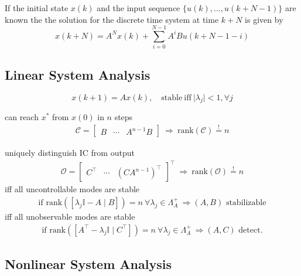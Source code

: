 If the initial state $x(k)$ and the input sequence $\{u(k), \ldots, u(k+N-1)\}$ are known the the solution for the discrete time system at time $k+N$ is given by
\begin{equation*}
    x(k+N) = A^N x(k) + \sum_{i=0}^{N-1} A^i B u(k+N-1-i)
\end{equation*}


\subsection{Linear System Analysis}


\noindent\begin{equation*}
    x(k+1) = Ax(k),\quad \mathrm{stable\ iff\ } \lvert \lambda_j \rvert < 1, \forall j
\end{equation*}


can reach $x^*$ from $x(0)$ in $n$ steps
\begin{align*}
    \mathcal{C} =
    \begin{bmatrix}
        B & \cdots & A^{n-1} B
    \end{bmatrix}
    \ \Rightarrow \ \mathrm{rank}(\mathcal{C}) \overset{!}{=} n
\end{align*}

 uniquely distinguish IC from output
\begin{align*}
    \mathcal{O} =
    \begin{bmatrix}
        C^\top & \cdots & {(CA^{n-1})}^\top
    \end{bmatrix}^\top
    \ \Rightarrow \ \mathrm{rank}(\mathcal{O}) \overset{!}{=} n
\end{align*}
 iff all uncontrollable modes are stable
\begin{align*}
    \textrm{if } \mathrm{rank}([\lambda_j \mathbb{I}-A \mid B]) = n \ \forall \lambda_j \in \Lambda_A^+ \ \Rightarrow (A,B) \textrm{ stabilizable}
\end{align*}
 iff all unobservable modes are stable
\begin{align*}
    \textrm{if } \mathrm{rank}([A^\top - \lambda_j \mathbb{I} \mid C^\top]) = n \ \forall \lambda_j \in \Lambda_A^+ \ \Rightarrow (A,C) \textrm{ detect.}
\end{align*}


\subsection{Nonlinear System Analysis}
